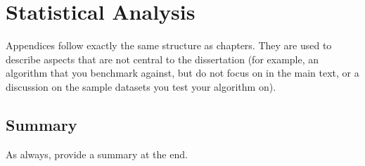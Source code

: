 \chapter{Statistical Analysis}
\label{app:statistical_analysis}

Appendices follow exactly the same structure as chapters. They are used to
describe aspects that are not central to the dissertation (for example, an
algorithm that you benchmark against, but do not focus on in the main text, or a
discussion on the sample datasets you test your algorithm on).

\section{Summary}
\label{app:statistical_analysis:summary}

As always, provide a summary at the end.

